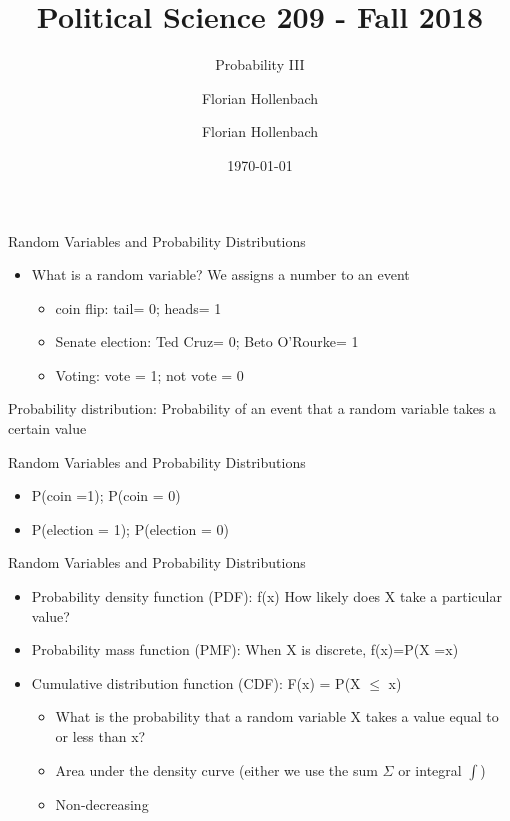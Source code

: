 \documentclass[presentation]{beamer}
\author{Florian Hollenbach}
\author{Florian Hollenbach}
\date{\today}
\title{Political Science 209 - Fall 2018}
\subtitle{Probability III}
\begin{document}
\maketitle


\begin{frame}[label={sec:org6313b5c}]{Random Variables and Probability Distributions}
\begin{itemize}
\item What is a random variable? We assigns a number to an event
\begin{itemize}
\item coin flip: tail= 0; heads= 1
\item Senate election: Ted Cruz= 0; Beto O'Rourke= 1
\item Voting: vote = 1; not vote = 0
\end{itemize}
\end{itemize}



\pause

Probability distribution: Probability of an event that a random variable takes a certain value
\end{frame}


\begin{frame}[label={sec:org0712a41}]{Random Variables and Probability Distributions}
\begin{itemize}
\item P(coin =1); P(coin = 0)
\item P(election = 1); P(election = 0)
\end{itemize}
\end{frame}


\begin{frame}[label={sec:org9141478}]{Random Variables and Probability Distributions}
\begin{itemize}
\item \alert{Probability density function (PDF)}: f(x) How likely does X take a particular value?
\item \alert{Probability mass function (PMF)}: When X is discrete, f(x)=P(X =x)
\end{itemize}

\pause

\begin{itemize}
\item \alert{Cumulative distribution function (CDF)}: F(x) = P(X \(\leq\) x)
\begin{itemize}
\item What is the probability that a random variable X takes a value equal to or less than x?
\item Area under the density curve (either we use the sum \(\Sigma\) or integral \(\int\))
\item Non-decreasing
\end{itemize}
\end{itemize}
\end{frame}
\end{document}
